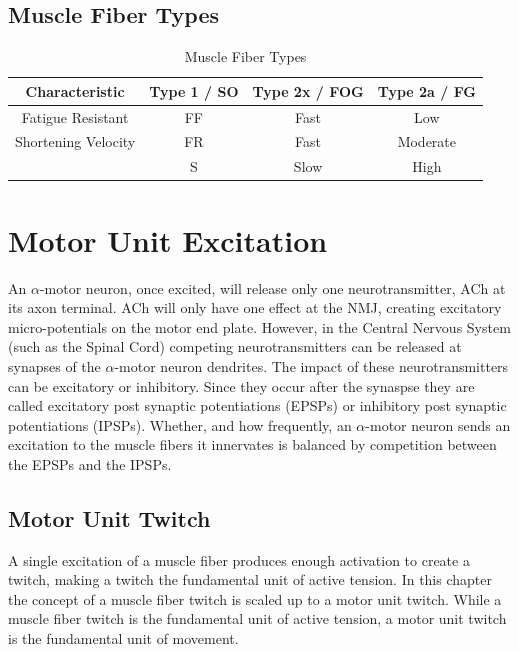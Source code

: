 \subsection{Muscle Fiber Types}


\begin{table}[h!]
\centering
\begin{tabular}{||c c c c ||} 
 \hline
Characteristic & Type 1 / SO & Type 2x / FOG & Type 2a / FG \\ 
 \hline\hline
 Fatigue Resistant & FF & Fast & Low \\ 
 Shortening Velocity & FR & Fast & Moderate \\
  & S & Slow & High \\ [1ex] 
 \hline
\end{tabular}
\caption{Muscle Fiber Types}
\label{table:Motor_Unit_Types}
\end{table}


\section{Motor Unit Excitation}

An $\alpha$-motor neuron, once excited, will release only one neurotransmitter, ACh at its axon terminal. ACh will only have one effect at the NMJ, creating excitatory micro-potentials on the motor end plate. However, in the Central Nervous System (such as the Spinal Cord) competing neurotransmitters can be released at synapses of the $\alpha$-motor neuron dendrites. The impact of these neurotransmitters can be excitatory or inhibitory. Since they occur after the synaspse they are called excitatory post synaptic potentiations (EPSPs) or inhibitory post synaptic potentiations (IPSPs). Whether, and how frequently, an $\alpha$-motor neuron sends an excitation to the muscle fibers it innervates is balanced by competition between the EPSPs and the IPSPs.



\subsection{Motor Unit Twitch}

A single excitation of a muscle fiber produces enough activation to create a twitch, making a twitch the fundamental unit of active tension. In this chapter the concept of a muscle fiber twitch is scaled up to a motor unit twitch. While a muscle fiber twitch is the fundamental unit of active tension, a motor unit twitch is the fundamental unit of movement.\footnotemark{}

